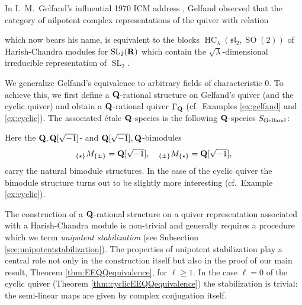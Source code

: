 \documentclass[a4paper,12pt,reqno]{amsart}
\newcommand{\RR}{{\rm\bf R}}
\newcommand{\QQ}{{\rm\bf Q}}
\DeclareMathOperator{\SL}{\mathrm{SL}}
\DeclareMathOperator{\SO}{\mathrm{SO}}
\DeclareMathOperator{\HC}{\mathrm{HC}}
\newcommand{\liesl}{{\mathfrak {sl}}}
\theoremstyle{plain}
\theoremstyle{remark}
\begin{document}
    In I.~M.~Gelfand's influential 1970 ICM address \cite{Gelfand1970}, Gelfand observed that the category of nilpotent complex representations of the quiver with relation
    \begin{center}
    \end{center}
    which now bears his name, is equivalent to the blocks $\HC_\lambda(\liesl_2,\SO(2))$ of Harish-Chandra modules for $\SL_2(\RR)$ which contain the $\sqrt{\lambda}$-dimensional irreducible representation of $\SL_2$.

    We generalize Gelfand's equivalence to arbitrary fields of characteristic $0$. To achieve this, we first define a $\QQ$-rational structure on Gelfand's quiver (and the cyclic quiver) and obtain a $\QQ$-rational quiver $\Gamma_\QQ$ (cf.\ Examples \ref{ex:gelfand} and \ref{ex:cyclic}). The associated \'etale $\QQ$-species is the following $\QQ$-species $S_{\rm Gelfand}$:
    \begin{center}
    \end{center}
    Here the $\QQ,\QQ[\sqrt{-1}]$- and $\QQ[\sqrt{-1}],\QQ$-bimodules
    \[
      {}_{\{\star\}}M_{\{\pm\}}=\QQ[\sqrt{-1}],\quad
      {}_{\{\pm\}}M_{\{\star\}}=\QQ[\sqrt{-1}],
    \]
    carry the natural bimodule structures. In the case of the cyclic quiver the bimodule structure turns out to be slightly more interesting (cf.\ Example \ref{ex:cyclic}).

    The construction of a $\QQ$-rational structure on a quiver representation associated with a Harish-Chandra module is non-trivial and generally requires a procedure which we term {\em unipotent stabilization} (see Subsection \ref{sec:unipotentstabilization}). The properties of unipotent stabilization play a central role not only in the construction itself but also in the proof of our main result, Theorem \ref{thm:EEQQequivalence}, for $\ell\geq1$. In the case $\ell=0$ of the cyclic quiver (Theorem \ref{thm:cyclicEEQQequivalence}) the stabilization is trivial: the semi-linear maps are given by complex conjugation itself.
\end{document}
